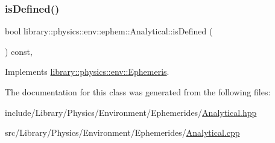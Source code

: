 \subsubsection{\texorpdfstring{is\+Defined()}{isDefined()}}
{\footnotesize\ttfamily bool library\+::physics\+::env\+::ephem\+::\+Analytical\+::is\+Defined (\begin{DoxyParamCaption}{ }\end{DoxyParamCaption}) const\hspace{0.3cm}{\ttfamily [override]}, {\ttfamily [virtual]}}



Implements \hyperlink{classlibrary_1_1physics_1_1env_1_1_ephemeris_abf61a03e24dd146199381db14d1d7c68}{library\+::physics\+::env\+::\+Ephemeris}.



The documentation for this class was generated from the following files\+:\begin{DoxyCompactItemize}
\item 
include/\+Library/\+Physics/\+Environment/\+Ephemerides/\hyperlink{_analytical_8hpp}{Analytical.\+hpp}\item 
src/\+Library/\+Physics/\+Environment/\+Ephemerides/\hyperlink{_analytical_8cpp}{Analytical.\+cpp}\end{DoxyCompactItemize}
